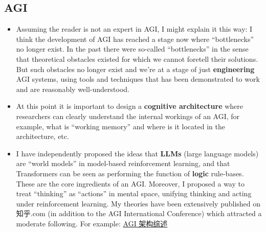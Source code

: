 \begin{preview}
\begin{minipage}{\textwidth}
	\setlength{\parskip}{0.4\baselineskip}

\section{AGI}

\begin{itemize}
	
	\item Assuming the reader is not an expert in AGI, I might explain it this way:  I think the development of AGI has reached a stage now where ``bottlenecks'' no longer exist.  In the past there were so-called ``bottlenecks'' in the sense that theoretical obstacles existed for which we cannot foretell their solutions.  But such obstacles no longer exist and we're at a stage of just \textbf{engineering} AGI systems, using tools and techniques that has been demonstrated to work and are reasonably well-understood.

	\item At this point it is important to design a \textbf{cognitive architecture} where researchers can clearly understand the internal workings of an AGI, for example, what is ``working memory'' and where is it located in the architecture, etc.
	
	\item I have independently proposed the ideas that \textbf{LLMs} (large language models) are ``world models'' in model-based reinforcement learning, and that Transformers can be seen as performing the function of \textbf{logic} rule-bases.  These are the core ingredients of an AGI.  Moreover, I proposed a way to treat ``thinking'' as ``actions'' in mental space, unifying thinking and acting under reinforcement learning.  My theories have been extensively published on 知乎.com (in addition to the AGI International Conference) which attracted a moderate following.  For example:  \href{https://zhuanlan.zhihu.com/p/615327294}{AGI 架构综述}
	

\end{itemize}
\end{minipage}
\end{preview}
